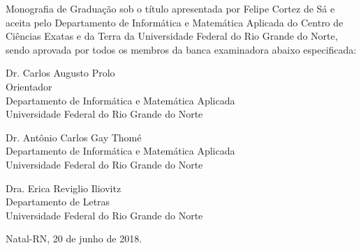 \begin{folhadeaprovacao}
	\setlength{\ABNTsignthickness}{0.4pt}
	\setlength{\ABNTsignwidth}{10cm}
	
	\noindent 
	Monografia de Graduação sob o título \textit{\tccTitle} apresentada por 
	Felipe Cortez de Sá e aceita pelo Departamento de Informática e Matemática Aplicada do
	Centro de Ciências Exatas e da Terra da Universidade Federal do Rio Grande do Norte,
	sendo aprovada por todos os membros da banca examinadora abaixo especificada:
		
	\assinatura
	{
		Dr. Carlos Augusto Prolo\\
		{\small Orientador} \\ 
		{\footnotesize
            Departamento de Informática e Matemática Aplicada\\
		  	Universidade Federal do Rio Grande do Norte
		}
	}
	
		
	\assinatura
	{
        Dr. Antônio Carlos Gay Thomé\\ 
		{\footnotesize
            Departamento de Informática e Matemática Aplicada\\
		  	Universidade Federal do Rio Grande do Norte
		}
	}
		
	\assinatura
	{
		Dra. Erica Reviglio Iliovitz \\ 
		{\footnotesize
            Departamento de Letras\\
		  	Universidade Federal do Rio Grande do Norte
		}
	}
		
	\vfill
	
	\begin{center}
		Natal-RN, 20 de junho de 2018.
	\end{center}
\end{folhadeaprovacao}
